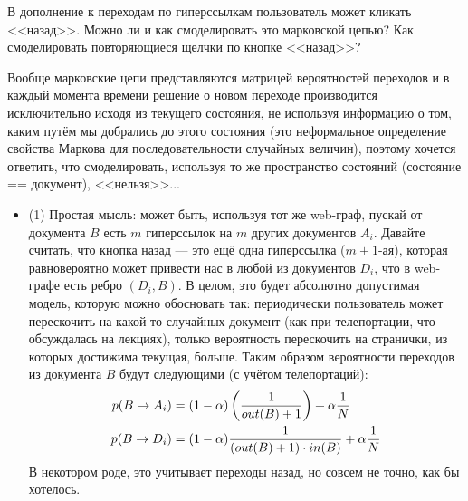 \begin{task}[3]
В дополнение к переходам по гиперссылкам пользователь может кликать <<назад>>. Можно ли и как смоделировать это марковской цепью? Как смоделировать повторяющиеся щелчки по кнопке <<назад>>?
\end{task}
\begin{solution}
Вообще марковские цепи представляются матрицей вероятностей переходов и в каждый момента времени решение о новом переходе производится исключительно исходя из текущего состояния, не используя информацию о том, каким путём мы добрались до этого состояния (это неформальное определение свойства Маркова для последовательности случайных величин), поэтому хочется ответить, что смоделировать, используя то же пространство состояний (состояние == документ), <<нельзя>>...
\begin{itemize}
	\item (1) Простая мысль: может быть, используя тот же web-граф, пускай от документа $B$ есть $m$ гиперссылок на $m$ других документов $A_i$. Давайте считать, что кнопка назад --- это ещё одна гиперссылка ($m+1$-ая), которая равновероятно может привести нас в любой из документов $D_i$, что в web-графе есть ребро $(D_i, B)$. В целом, это будет абсолютно допустимая модель, которую можно обосновать так: периодически пользователь может перескочить на какой-то случайных документ (как при телепортации, что обсуждалась на лекциях), только вероятность перескочить на странички, из которых достижима текущая, больше. Таким образом вероятности переходов из документа $B$ будут следующими (с учётом телепортаций):
	\begin{align*}
		p(B\rightarrow A_i) &= (1-\alpha)\left( \frac{1}{out(B) + 1} \right) + \alpha\frac{1}{N}\\
		p(B\rightarrow D_i) &= (1-\alpha)\frac{1}{(out(B)+1)\cdot in(B)} + \alpha\frac{1}{N}
	\end{align*}
	В некотором роде, это учитывает переходы назад, но совсем не точно, как бы хотелось.


\end{itemize}
\end{solution}
